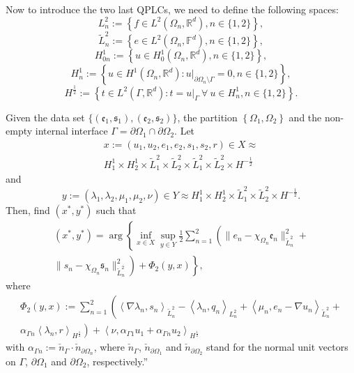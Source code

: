 Now to introduce the two last QPLCs, we need to define the following spaces:
$$L^2_n := \left\{ f \in L^2(\Omega_n, \mathbb{R}^d), n \in \{1,2\} \right\},$$
$$\tilde{L}^2_n := \left\{ e \in L^2(\Omega_n, \mathbb{F}^d), n \in \{1,2\} \right\},$$
$$H^1_{0n} := \left\{ u \in H^1_0(\Omega_n, \mathbb{R}^d), n \in \{1,2\} \right\},$$
$$H^1_n := \left\{ u \in H^1(\Omega_n, \mathbb{R}^d) : \left. u \right|_{\partial \Omega_n \setminus \Gamma} = 0, n \in \{1,2\} \right\},$$
$$H^\frac12:= \left\{ t \in L^2(\Gamma, \mathbb{R}^d): t = \left. u \right|_{\Gamma} \: \forall \: u \in H^1_n, n \in \{1,2\} \right\}.$$

\begin{problem}[QPLC2]
Given the data set $\{\!(\mathfrak{e}_1,\!\mathfrak{s}_1),\!(\mathfrak{e}_2,\!\mathfrak{s}_2)\!\}$, the partition $\left\{\Omega_1, \Omega_2 \right\}$ and the non-empty internal interface $\Gamma = \partial \Omega_1 \cap \partial \Omega_2$.
Let
\begin{multline}
x := 
(u_1, u_2, e_1, e_2, s_1, s_2, r)
\in X \approx \\
H^1_1 \times
H^1_2 \times
\tilde{L}^2_1 \times
\tilde{L}^2_2 \times
\tilde{L}^2_1 \times
\tilde{L}^2_2 \times
H^{-\frac12}
\end{multline}
and
\begin{equation}
y :=
(\lambda_1, \lambda_2, \mu_1, \mu_2, \nu)
\in Y \approx
H^1_1 \times
H^1_2 \times
\tilde{L}^2_1 \times
\tilde{L}^2_2 \times
H^{-\frac12}.
\end{equation}
Then, find $(x^*, y^*)$ such that
\begin{multline}
(x^*, y^*) =
\arg
\left\{
\inf_{x \in X}
\sup_{y \in Y}
\frac12 \sum_{n=1}^{2}
\left(
\|e_n -\chi_{\Omega_n}\mathfrak{e}_n\|^2_{\tilde{L}^2_n}+
\right.
\right.
\\
\left.
\left.
\|s_n -\chi_{\Omega_n}\mathfrak{s}_n\|^2_{\tilde{L}^2_n}
\right)+
\Phi_2(y,x)
\right\},
\end{multline}
where
\begin{multline}
    \Phi_2(y,x) :=
    \sum_{n=1}^{2}
    \left(
    \left\langle \nabla \lambda_n, s_n \right\rangle_{\tilde{L}^2_n}-
    \left\langle \lambda_n, q_n \right\rangle_{L^2_n}+
    \left\langle \mu_n, e_n - \nabla u_n \right\rangle_{\tilde{L}^2_n}\right.+\\
    \left. \alpha_{\Gamma n} \left \langle \lambda_n, r \right \rangle_{H^\frac12}
    \right)+
    \left\langle \nu, \alpha_{\Gamma 1} u_1+ \alpha_{\Gamma n} u_2\right\rangle_{H^\frac12}
\end{multline}
with $\alpha_{\Gamma n}:=\check{n}_\Gamma\cdot \check{n}_{\partial \Omega_n}$, where $\check{n}_\Gamma$, $\check{n}_{\partial \Omega_1}$ and $\check{n}_{\partial \Omega_2}$ stand for the normal unit vectors on $\Gamma$, $\partial \Omega_1$ and $\partial \Omega_2$, respectively.''
\end{problem}

